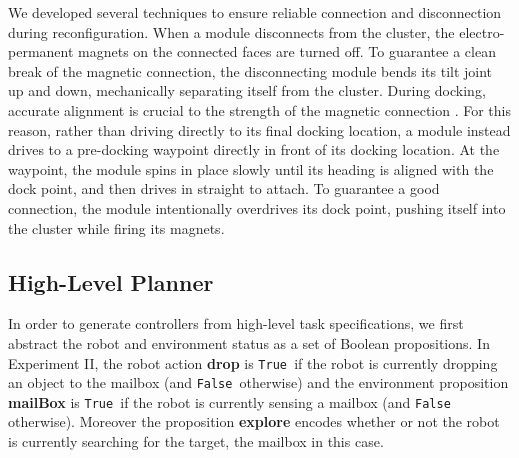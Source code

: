 \documentclass[12pt]{article}
\newcommand{\lt}{{\tt True }}
\newcommand{\lf}{{\tt False }}
\begin{document}
We developed several techniques to ensure reliable connection and disconnection during reconfiguration.  
When a module disconnects from the cluster, the electro-permanent magnets on the connected faces are turned off.  To guarantee a clean break of the magnetic connection, the disconnecting module bends its tilt joint up and down, mechanically separating itself from the cluster. During docking, accurate alignment is crucial to the strength of the magnetic connection \cite{tosun2016design}.  For this reason, rather than driving directly to its final docking location, a module instead drives to a pre-docking waypoint directly in front of its docking location.  At the waypoint, the module spins in place slowly until its heading is aligned with the dock point, and then drives in straight to attach. To guarantee a good connection, the module intentionally overdrives its dock point, pushing itself into the cluster while firing its magnets.
%

\subsection{High-Level Planner}
\label{sec:high-level}

In order to generate controllers from high-level task specifications, we first abstract the robot and environment status as a set of Boolean propositions.
In Experiment II, the robot action \textbf{drop} is \lt if the robot is currently dropping an object to the mailbox (and \lf otherwise) and the environment proposition \textbf{mailBox} is \lt if the robot is currently sensing a mailbox (and \lf otherwise).
Moreover the proposition \textbf{explore} encodes whether or not the robot is currently searching for the target, the mailbox in this case.
\end{document}
